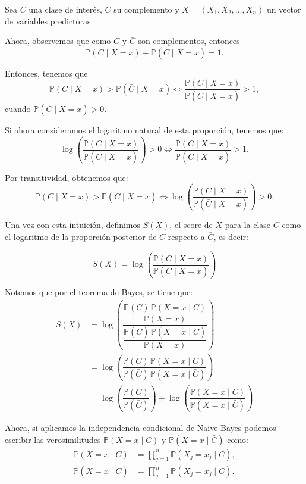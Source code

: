 \documentclass[
 12pt,
 letterpaper,
]{article}
\theoremstyle{teoremaBreak}
\theoremstyle{plain}
\theoremstyle{definition}
\begin{document}
Sea $C$ una clase de interés, $\bar{C}$ su complemento y  $X = (X_1, X_2, \ldots, X_n)$ un vector de variables predictoras.

Ahora, observemos que como $C$ y $\bar{C}$ son complementos, entonces
\[
\mathbb{P}(C \mid X = x) + \mathbb{P}(\bar{C} \mid X = x) = 1.
\]

Entonces, tenemos que
\[
\mathbb{P}(C \mid X = x) > \mathbb{P}(\bar{C} \mid X = x)
\iff
\dfrac{\mathbb{P}(C \mid X = x)}{\mathbb{P}(\bar{C} \mid X = x)} > 1,
\]
cuando $\mathbb{P}(\bar{C} \mid X = x) > 0$.

Si ahora consideramos el logaritmo natural de esta proporción, tenemos que:
\[
\log\left(\dfrac{\mathbb{P}(C \mid X = x)}{\mathbb{P}(\bar{C} \mid X = x)}\right) > 0
\iff
\dfrac{\mathbb{P}(C \mid X = x)}{\mathbb{P}(\bar{C} \mid X = x)} > 1.
\]

Por transitividad, obtenemos que:
\[
\mathbb{P}(C \mid X = x) > \mathbb{P}(\bar{C} \mid X = x)
\iff
\log\left(\dfrac{\mathbb{P}(C \mid X = x)}{\mathbb{P}(\bar{C} \mid X = x)}\right) > 0.
\]


Una vez con esta intuición, definimos $S(X)$, el score de $X$ para la clase $C$ como el logaritmo de la proporción posterior de $C$ respecto a $\bar{C}$, es decir:

\[
S(X) = \log\left(\dfrac{\mathbb{P}(C \mid X = x)}{\mathbb{P}(\bar{C} \mid X = x)}\right)
\]

Notemos que por el teorema de Bayes, se tiene que:
\begin{align*}
S(X) & = \log\left(\dfrac{\dfrac{\mathbb{P}(C)\,\mathbb{P}(X = x \mid C)}{\mathbb{P}(X = x)}}{\dfrac{\mathbb{P}(\bar{C})\,\mathbb{P}(X = x \mid \bar{C})}{\mathbb{P}(X = x)}}\right)\\
& = \log\left(\dfrac{\mathbb{P}(C)\,\mathbb{P}(X = x \mid C)}{\mathbb{P}(\bar{C})\,\mathbb{P}(X = x \mid \bar{C})}\right)\\
& = \log\left(\dfrac{\mathbb{P}(C)}{\mathbb{P}(\bar{C})}\right) + \log\left(\dfrac{\mathbb{P}(X = x \mid C)}{\mathbb{P}(X = x \mid \bar{C})}\right)
\end{align*}

Ahora, si aplicamos la independencia condicional de Naive Bayes podemos escribir las verosimilitudes $\mathbb{P}(X = x \mid C)$ y $\mathbb{P}(X = x \mid \bar{C})$ como:
\begin{align*}
\mathbb{P}(X = x \mid C) &= \prod_{j = 1}^n \mathbb{P}(X_j = x_j \mid C), \\
\mathbb{P}(X = x \mid \bar{C}) &= \prod_{j = 1}^n \mathbb{P}(X_j = x_j \mid \bar{C}).
\end{align*}
\end{document}

